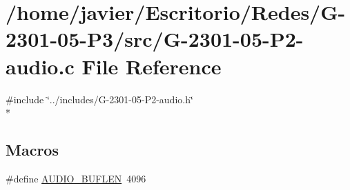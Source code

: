 \hypertarget{_g-2301-05-_p2-audio_8c}{\section{/home/javier/\-Escritorio/\-Redes/\-G-\/2301-\/05-\/\-P3/src/\-G-\/2301-\/05-\/\-P2-\/audio.c File Reference}
\label{_g-2301-05-_p2-audio_8c}
}
{\ttfamily \#include \char`\"{}../includes/\-G-\/2301-\/05-\/\-P2-\/audio.\-h\char`\"{}}\\*
\subsection*{Macros}
\begin{DoxyCompactItemize}
\item 
\#define \hyperlink{_g-2301-05-_p2-audio_8c_a88007cd1caf5537d34251bcc91704402}{A\-U\-D\-I\-O\-\_\-\-B\-U\-F\-L\-E\-N}~4096
\end{DoxyCompactItemize}
